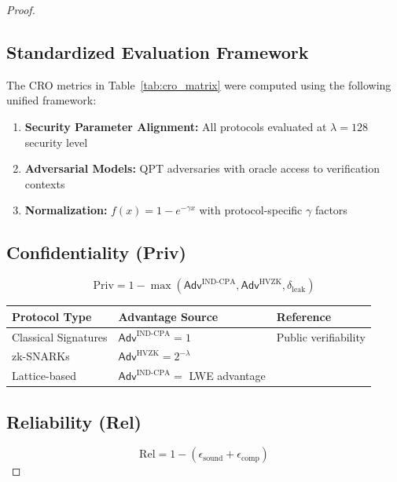 \documentclass[preprint,12pt]{elsarticle}
\newcommand{\Adv}{\mathsf{Adv}}
\begin{document}
\begin{proof}
            \subsection{Standardized Evaluation Framework}\label{app:standard_eval_framework}
                The CRO metrics in Table~\ref{tab:cro_matrix} were computed using the following unified framework:

                \begin{enumerate}
                    \item \textbf{Security Parameter Alignment:} All protocols evaluated at $\lambda = 128$ security level
                    \item \textbf{Adversarial Models:} QPT adversaries with oracle access to verification contexts
                    \item \textbf{Normalization:} $f(x) = 1 - e^{-\gamma x}$ with protocol-specific $\gamma$ factors
                \end{enumerate}

            \subsection{Confidentiality (Priv)}\label{app:confidential}
                \[
                    \mathrm{Priv} = 1 - \max \left( \Adv^{\mathrm{IND}\mbox{-}\mathrm{CPA}}, \Adv^{\mathrm{HVZK}}, \delta_{\mathrm{leak}} \right)
                \]

                \begin{table}[h]
                    \centering
                    \begin{tabular}{lll}
                        \toprule
                        \textbf{Protocol Type} & \textbf{Advantage Source} & \textbf{Reference} \\
                        \midrule
                        Classical Signatures & $\Adv^{\mathrm{IND}\mbox{-}\mathrm{CPA}} = 1$ & Public verifiability \\
                        zk-SNARKs & $\Adv^{\mathrm{HVZK}} = 2^{-\lambda}$ & \cite{Groth2016} \\
                        Lattice-based & $\Adv^{\mathrm{IND}\mbox{-}\mathrm{CPA}} =$ LWE advantage & \cite{Ducas2018} \\
                        \bottomrule
                    \end{tabular}
                \end{table}

            \subsection{Reliability (Rel)}\label{app:reliability}
                \[
                \mathrm{Rel} = 1 - (\epsilon_{\mathrm{sound}} + \epsilon_{\mathrm{comp}})
                \]


\end{proof}
\end{document}
